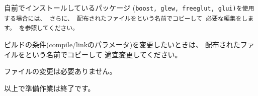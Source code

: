 \bigskip
\noindent
自前でインストールしているパッケージ
(\tt{boost}, \tt{glew}, \tt{freeglut}, \tt{glui})を使用する場合には、
さらに、
配布されたファイルを\CMakeConf{}という名前でコピーして
必要な編集をします。
を参照してください。

\medskip
\noindent
ビルドの条件(compile/linkのパラメータ)を変更したいときは、
配布されたファイルを\CMakeOpts{}という名前でコピーして
適宜変更してください。

\medskip
\noindent
ファイル\CMakeLists{}の変更は必要ありません。

\medskip
\noindent
以上で準備作業は終了です。

